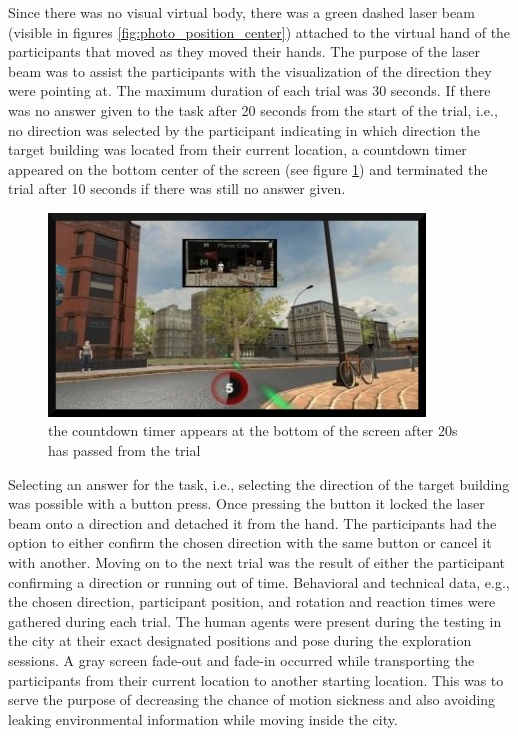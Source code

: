 Since there was no visual virtual body, there was a green dashed laser beam (visible in figures \ref{fig:photo_position_center}) attached to the virtual hand of the participants that moved as they moved their hands. The purpose of the laser beam was to assist the participants with the visualization of the direction they were pointing at. The maximum duration of each trial was 30 seconds. If there was no answer given to the task after 20 seconds from the start of the trial, i.e., no direction was selected by the participant indicating in which direction the target building was located from their current location, a countdown timer appeared on the bottom center of the screen (see figure \ref{fig:timer}) and terminated the trial after 10 seconds if there was still no answer given. 


\begin{figure}[!htb]
	\centering
	\includegraphics[width=100mm]{figures/timer.jpg}
	\caption[The countdown timer]{the countdown timer appears at the bottom of the screen after 20s has passed from the trial}
	\label{fig:timer}
\end{figure}

Selecting an answer for the task, i.e., selecting the direction of the target building was possible with a button press. Once pressing the button it locked the laser beam onto a direction and detached it from the hand. The participants had the option to either confirm the chosen direction with the same button or cancel it with another. Moving on to the next trial was the result of either the participant confirming a direction or running out of time. Behavioral and technical data, e.g., the chosen direction, participant position, and rotation and reaction times were gathered during each trial. The human agents were present during the testing in the city at their exact designated positions and pose during the exploration sessions. A gray screen fade-out and fade-in occurred while transporting the participants from their current location to another starting location. This was to serve the purpose of decreasing the chance of motion sickness and also avoiding leaking environmental information while moving inside the city.



